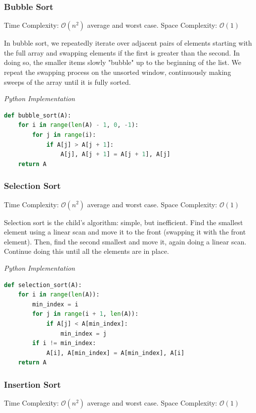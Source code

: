 \documentclass{article}
\newcommand{\bigO}{\mathcal{O}}
\begin{document}
    \subsubsection{Bubble Sort}
    Time Complexity: $\bigO(n^2)$ average and worst case. Space Complexity: $\bigO(1)$
     
    In bubble sort, we repeatedly iterate over adjacent pairs of elements starting with the full array and swapping elements if the first is greater than the second. In doing so, the smaller items slowly "bubble" up to the beginning of the list. We repeat the swapping process on the unsorted window, continuously making sweeps of the array until it is fully sorted. 

\vspace{8pt} \emph{Python Implementation}
\begin{lstlisting}[language=Python]
def bubble_sort(A):
    for i in range(len(A) - 1, 0, -1):
        for j in range(i):
            if A[j] > A[j + 1]:
                A[j], A[j + 1] = A[j + 1], A[j]
    return A
\end{lstlisting}
    \subsubsection{Selection Sort}
    Time Complexity: $\bigO(n^2)$ average and worst case. Space Complexity: $\bigO (1)$
    
    Selection sort is the child's algorithm: simple, but inefficient. Find the smallest element using a linear scan and move it to the front (swapping it with the front element). Then, find the second smallest and move it, again doing a linear scan. Continue doing this until all the elements are in place. 

\vspace{8pt} \emph{Python Implementation}
\begin{lstlisting}[language=Python]
def selection_sort(A):
    for i in range(len(A)):
        min_index = i
        for j in range(i + 1, len(A)):
            if A[j] < A[min_index]:
                min_index = j
        if i != min_index: 
            A[i], A[min_index] = A[min_index], A[i]
    return A
\end{lstlisting}
    
    \subsubsection{Insertion Sort}
    Time Complexity: $\bigO(n^2)$ average and worst case. Space Complexity: $\bigO(1)$
    
\end{document}
